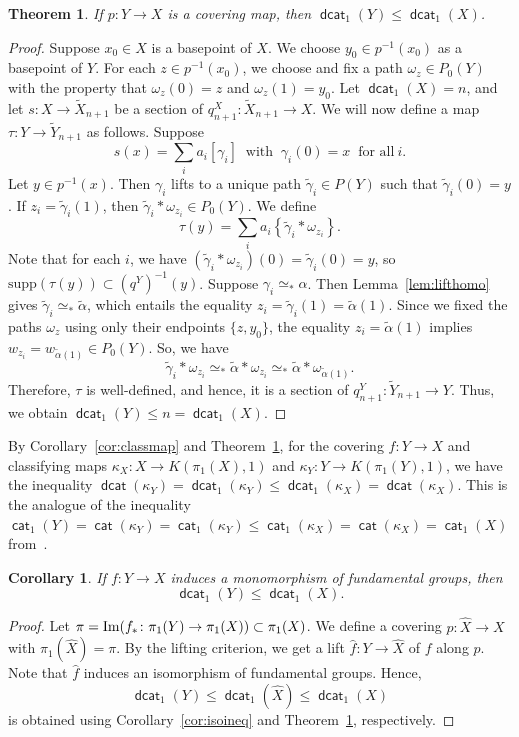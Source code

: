 \documentclass[amscd,amssymb,verbatim,11pt]{amsart}
\theoremstyle{plain}
\newtheorem{theorem}[thm]{Theorem}
\newtheorem{corollary}[thm]{Corollary}
\theoremstyle{definition}
\DeclareMathOperator{\cat}{{\mathsf{cat}}}
\DeclareMathOperator{\dcat}{{\mathsf{dcat}}}
\def\Im{\protect\operatorname{Im}}
\def\wt{\widetilde}
\begin{document}
\begin{theorem}\label{theo:mainresult1}
If $p\colon Y \to X$ is a covering map, then $\dcat_1(Y) \leq \dcat_1(X)$.
\end{theorem}
\begin{proof}
Suppose $x_0\in X$ is a basepoint of $X$. We choose $y_0\in p^{-1}(x_0)$ as a basepoint of $Y$. For each $z\in p^{-1}(x_0)$, we choose and fix a path $\omega_z\in P_0(Y)$ with the property that $\omega_z(0)=z$ and $\omega_z(1)=y_0$. Let $\dcat_1(X)=n$, and let $s\colon X \to \widetilde X_{n+1}$ be a section of $q_{n+1}^X:\widetilde{X}_{n+1}\to X$. We will now define a map $\tau\colon Y \to \widetilde Y_{n+1}$ as follows. Suppose
\[
s(x) = \sum_i a_i [\gamma_i]\ \text{ with }\ \gamma_i(0)=x\ \text{ for\ all}\  i.
\]
Let $y\in p^{-1}(x)$. Then $\gamma_i$ lifts to a unique path $\widetilde{\gamma}_i\in P(Y)$ such that $\widetilde{\gamma}_i(0)=y$. If $z_i=\widetilde{\gamma}_i(1)$, then $\widetilde{\gamma}_i\ast \omega_{z_i} \in P_0(Y)$. We define
\[
\tau(y) = \sum_i a_i \left\{\widetilde{\gamma}_i\ast\omega_{z_i}\right\}.
\]
Note that for each $i$, we have $(\widetilde{\gamma}_i\ast\omega_{z_i})(0)=\widetilde{\gamma}_i(0)=y$, so
$\text{supp}(\tau(y)) \subset (q^Y)^{-1}(y)$. Suppose $\gamma_i\simeq_* \alpha$. Then Lemma~\ref{lem:lifthomo} gives $\widetilde\gamma_i \simeq_* \widetilde\alpha$, which entails the equality $z_i=\widetilde\gamma_i(1)=\wt \alpha(1)$. Since we fixed the paths $\omega_{z}$ using only their endpoints $\{z,y_0\}$, the equality $z_i=\wt\alpha(1)$ implies $w_{z_i}=w_{\wt\alpha(1)}\in P_0(Y)$. So, we have
\[
\widetilde\gamma_i \ast \omega_{z_i} \simeq_* \wt\alpha \ast \omega_{z_i} \simeq_* \wt\alpha\ast \omega_{\wt\alpha(1)} .
\]
Therefore, $\tau$ is well-defined, and hence, it is a section of $q_{n+1}^Y:\widetilde{Y}_{n+1}\to Y$. Thus, we obtain $\dcat_1(Y) \leq n=\dcat_1(X)$.
\end{proof}

By Corollary~\ref{cor:classmap} and Theorem~\ref{theo:mainresult1}, for the covering $f\colon Y\to X$ and classifying maps $\kappa_X\colon X\to K(\pi_1(X),1)$ and $\kappa_Y\colon Y\to K(\pi_1(Y),1)$, we have the inequality $\dcat(\kappa_Y)=\dcat_1(\kappa_Y)\le\dcat_1(\kappa_X)=\dcat(\kappa_X)$. This is the analogue of the inequality $\cat_1(Y)=\cat(\kappa_Y)=\cat_1(\kappa_Y) \le \cat_1(\kappa_X)=\cat(\kappa_X)=\cat_1(X)$ from~\cite{OS}.

\begin{corollary}\label{cov:covineq}
If $f\colon Y \to X$ induces a monomorphism of fundamental groups, then
\[
\dcat_1(Y)\le\dcat_1(X).
\]
\end{corollary}
\begin{proof}
    Let $\pi= \Im(f_*\colon \pi_1(Y) \to \pi_1(X)) \subset \pi_1(X)$. We define a covering $p:\widehat{X}\to X$ with $\pi_1(\widehat{X})=\pi$. By the lifting criterion, we get a lift $\widehat{f}:Y\to \widehat{X}$ of $f$ along $p$. Note that $\widehat{f}$ induces an isomorphism of fundamental groups. Hence,
    \[
    \dcat_1(Y)\le\dcat_1(\widehat{X})\le\dcat_1(X)
    \]
    is obtained using Corollary~\ref{cor:isoineq} and Theorem~\ref{theo:mainresult1}, respectively.
\end{proof}
\end{document}
